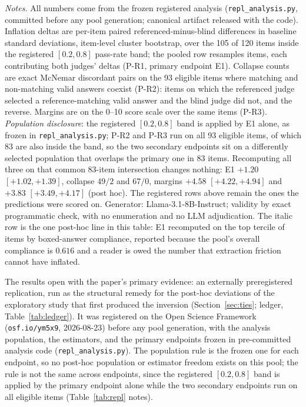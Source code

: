 \documentclass[11pt]{article}
\begin{document}
\begin{table}[tbp]
\medskip
\begin{minipage}{0.97\textwidth}
\footnotesize
\emph{Notes.}
All numbers come from the frozen registered analysis (\texttt{repl\_analysis.py}, committed before any pool generation; canonical artifact released with the code).
Inflation deltas are per-item paired referenced-minus-blind differences in baseline standard deviations, item-level cluster bootstrap, over the 105 of 120 items inside the registered $[0.2, 0.8]$ pass-rate band; the pooled row resamples items, each contributing both judges' deltas (P-R1, primary endpoint E1).
Collapse counts are exact McNemar discordant pairs on the 93 eligible items where matching and non-matching valid answers coexist (P-R2): items on which the referenced judge selected a reference-matching valid answer and the blind judge did not, and the reverse.
Margins are on the 0--10 score scale over the same items (P-R3).
\emph{Population disclosure}: the registered $[0.2, 0.8]$ band is applied by E1 alone, as frozen in \texttt{repl\_analysis.py}; P-R2 and P-R3 run on all 93 eligible items, of which 83 are also inside the band, so the two secondary endpoints sit on a differently selected population that overlaps the primary one in 83 items.
Recomputing all three on that common 83-item intersection changes nothing: E1 $+1.20$ $[+1.02, +1.39]$, collapse $49/2$ and $67/0$, margins $+4.58$ $[+4.22, +4.94]$ and $+3.83$ $[+3.49, +4.17]$ (post hoc).
The registered rows above remain the ones the predictions were scored on.
Generator: Llama-3.1-8B-Instruct; validity by exact programmatic check, with no enumeration and no LLM adjudication.
The italic row is the one post-hoc line in this table: E1 recomputed on the top tercile of items by boxed-answer compliance, reported because the pool's overall compliance is $0.616$ and a reader is owed the number that extraction friction cannot have inflated.
\end{minipage}
\caption{\textbf{Takeaway: the preregistered replication confirms all three registered predictions, with a pooled inflation delta about two and a half times the original Ties-pool estimate and both judges individually significant.}
Externally registered at \texttt{osf.io/ym5x9} before any pool generation.}
\label{tab:repl}
\end{table}

The results open with the paper's primary evidence: an externally preregistered replication, run as the structural remedy for the post-hoc deviations of the exploratory study that first produced the inversion (Section~\ref{sec:ties}; ledger, Table~\ref{tab:ledger}).
It was registered on the Open Science Framework (\texttt{osf.io/ym5x9}, 2026-08-23) before any pool generation, with the analysis population, the estimators, and the primary endpoints frozen in pre-committed analysis code (\texttt{repl\_analysis.py}).
The population rule is the frozen one for each endpoint, so no post-hoc population or estimator freedom exists on this pool; the rule is not the same across endpoints, since the registered $[0.2, 0.8]$ band is applied by the primary endpoint alone while the two secondary endpoints run on all eligible items (Table~\ref{tab:repl} notes).
\end{document}
